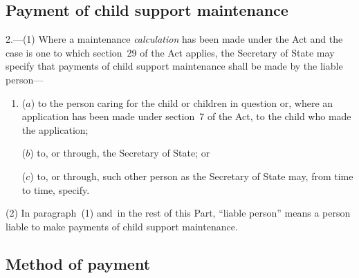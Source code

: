 \documentclass[12pt,a4paper]{article}
\begin{document}
\renewcommand\parthead{--- Part II}

\subsection[2. Payment of child support maintenance]{Payment of child support maintenance}

2.—(1) Where a maintenance 
\emph{calculation}  %
has been made under the Act and the case is one to which section~29 of the Act applies, the Secretary of State may specify that payments of child support maintenance shall be made by the liable person—
\begin{enumerate}\item[]
($a$) to the person caring for the child or children in question or, where an application has been made under section~7 of the Act, to the child who made the application;

($b$) to, or through, the Secretary of State; or

($c$) to, or through, such other person as the Secretary of State may, from time to time, specify.
\end{enumerate}

(2) In paragraph~(1) and~in the rest of this Part, “liable person” means a person liable to make payments of child support maintenance.


\subsection[3. Method of payment]{Method of payment}
\end{document}
